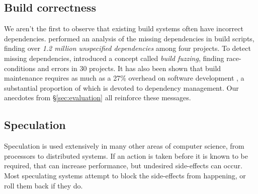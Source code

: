 %

\subsection{Build correctness}

We aren't the first to observe that existing build systems often have incorrect dependencies.  \citet{bezemer2017empirical} performed an analysis of the missing dependencies in \Make build scripts, finding over \emph{1.2 million unspecified dependencies} among four projects. To detect missing dependencies, \citet{detecting_incorrect_build_rules} introduced a concept called \emph{build fuzzing}, finding race-conditions and errors in 30 projects. It has also been shown that build maintenance requires as much as a 27\% overhead on software development \cite{build_maintenance}, a substantial proportion of which is devoted to dependency management. Our anecdotes from \S\ref{sec:evaluation} all reinforce these messages.

\subsection{Speculation}

Speculation is used extensively in many other areas of computer science, from processors to distributed systems. If an action is taken before it is known to be required, that can increase performance, but undesired side-effects can occur. Most speculating systems attempt to block the side-effects from happening, or roll them back if they do.

